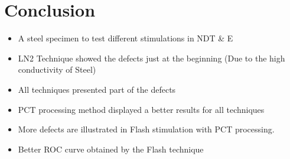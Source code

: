 \documentclass[]{spie}  %
\begin{document}
\section{Conclusion} %
\label{sec:conclusion}
\begin{itemize}
   \item A steel specimen to test different stimulations in NDT \& E
   \item LN2 Technique showed the defects just at the beginning (Due to the high conductivity of Steel)
   \item All techniques presented part of the defects
   \item PCT processing method displayed a better results for all techniques
   \item More defects are illustrated in Flash stimulation with PCT processing.
   \item Better ROC curve obtained by the Flash technique

\end{itemize}




\end{document}

